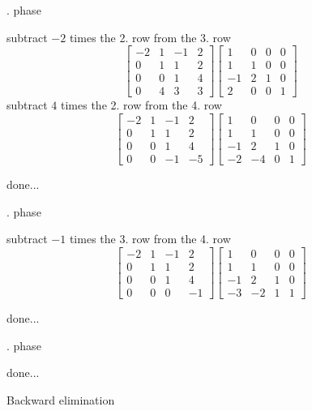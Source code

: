 \documentclass[12pt]{article}
\begin{document}
\par{}. phase

subtract $-2$ times the 2. row from the 3. row
$$\left[{\begin{array}{cccc}-2& 1& -1& 2\\ 0& 1& 1& 2\\ 0& 0& 1& 4\\ 0& 4& 3& 3\end{array}}\right]\left[{\begin{array}{cccc}1& 0& 0& 0\\ 1& 1& 0& 0\\ -1& 2& 1& 0\\ 2& 0& 0& 1\end{array}}\right]$$
subtract $4$ times the 2. row from the 4. row
$$\left[{\begin{array}{cccc}-2& 1& -1& 2\\ 0& 1& 1& 2\\ 0& 0& 1& 4\\ 0& 0& -1& -5\end{array}}\right]\left[{\begin{array}{cccc}1& 0& 0& 0\\ 1& 1& 0& 0\\ -1& 2& 1& 0\\ -2& -4& 0& 1\end{array}}\right]$$
\par\noindent done...


\par{}. phase

subtract $-1$ times the 3. row from the 4. row
$$\left[{\begin{array}{cccc}-2& 1& -1& 2\\ 0& 1& 1& 2\\ 0& 0& 1& 4\\ 0& 0& 0& -1\end{array}}\right]\left[{\begin{array}{cccc}1& 0& 0& 0\\ 1& 1& 0& 0\\ -1& 2& 1& 0\\ -3& -2& 1& 1\end{array}}\right]$$
\par\noindent done...


\par{}. phase

\par\noindent done...


\par\noindent Backward elimination
\end{document}
